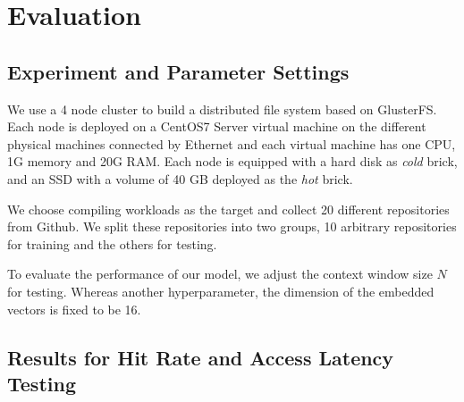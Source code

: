 \documentclass[conference]{IEEEtran}
\begin{document}
\section{Evaluation}
\subsection{Experiment and Parameter Settings}
We use a 4 node cluster to build a distributed file system based on GlusterFS. Each node is deployed on a CentOS7 Server virtual machine on the different physical machines connected by Ethernet and each virtual machine has one CPU, 1G memory and 20G RAM. Each node is equipped with a hard disk as \textit{cold} brick, and an SSD with a volume of 40 GB deployed as the \textit{hot} brick.

We choose compiling workloads as the target and collect 20 different repositories from Github. We split these repositories into two groups, 10 arbitrary repositories for training and the others for testing. 

To evaluate the performance of our model, we adjust the context window size $N$ for testing. Whereas another hyperparameter, the dimension of the embedded vectors is fixed to be 16. 
\subsection{Results for Hit Rate and Access Latency Testing}
\end{document}
